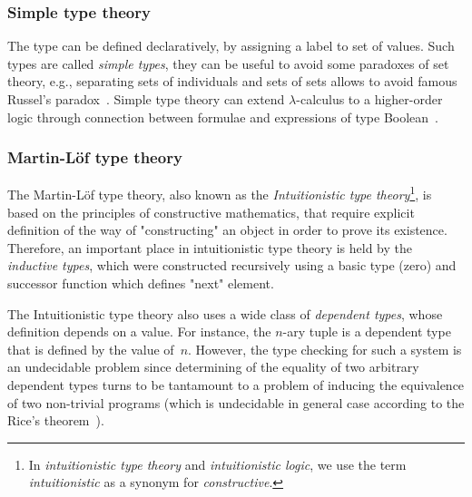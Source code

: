 \documentclass[article]{aaltoseries}
\begin{document}
\subsubsection{Simple type theory}
The type can be defined declaratively, by assigning a label to set of values. Such types are called \textit{simple types}, they can be useful to avoid some paradoxes of set theory, e.g., separating sets of individuals and sets of sets allows to avoid famous Russel's paradox~\cite{Irv95}. Simple type theory can extend $\lambda$-calculus to a higher-order logic through connection between formulae and expressions of type Boolean~\cite{Paulson90}.



\subsubsection{Martin-Löf type theory}
The Martin-Löf type theory, also known as the \textit{Intuitionistic type theory}\footnote{In \textit{intuitionistic type theory} and \textit{intuitionistic logic}, we use the term \textit{intuitionistic} as a synonym for \textit{constructive}.}, is based on the principles of constructive mathematics, that require explicit definition of the way of "constructing" an object in order to prove its existence. Therefore, an important place in intuitionistic type theory is held by the \textit{inductive types}, which were constructed recursively using a basic type (zero) and successor function which defines "next" element.

The Intuitionistic type theory also uses a wide class of \textit{dependent types}, whose definition depends on a value. For instance, the $n$-ary tuple is a dependent type that is defined by the value of~$n$. However, the type checking for such a system is an undecidable problem since determining of the equality of two arbitrary dependent types turns to be tantamount to a problem of inducing the equivalence of two non-trivial programs (which is undecidable in general case according to the Rice's theorem~\cite{Rice53}).
\end{document}
